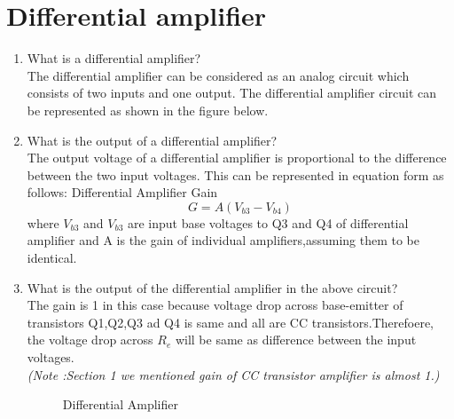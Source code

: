 \documentclass[journal,12pt,twocolumn]{IEEEtran}
\renewcommand\thesection{\arabic{section}}
\begin{document}
\section{Differential amplifier}
\begin{enumerate}[label=\thesection.\arabic*,ref=\thesection.\theenumi]
\item What is a differential amplifier?\\
\solution The differential amplifier can be considered as an analog circuit which consists of two inputs and one output. The differential amplifier circuit can be represented as shown in the figure below.\\
\item What is the output of a differential amplifier?\\
\solution The output voltage of a differential amplifier is proportional to the difference between the two input voltages. This can be represented in equation form as follows:
Differential Amplifier Gain $$G = A(V_{b3}-V_{b4})$$
where $V_{b3}$ and $V_{b3}$ are input base voltages to Q3 and Q4 of differential amplifier and A is the gain of individual amplifiers,assuming them to be identical.\\


\item What is the output of the differential amplifier in the above circuit?\\

 \solution The gain is 1 in this case because voltage drop across base-emitter of transistors Q1,Q2,Q3 ad Q4 is same and all are CC transistors.Therefoere, the voltage drop across $R_{e}$ will be same as difference between the input voltages.\\\textit{(Note :Section 1 we mentioned gain of CC transistor amplifier is almost 1.)}\\
\begin{figure}[!ht]
\centering	
\resizebox{\columnwidth}{!}{}
\caption{Differential Amplifier}
\label{fig:diff}	
\end{figure}
\end{enumerate}

\end{document}
